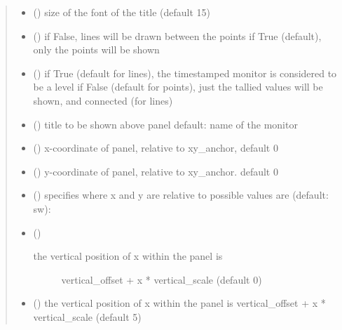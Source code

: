 \documentclass[letterpaper,10pt,english]{sphinxmanual}
\begin{document}
\begin{fulllineitems}
\begin{fulllineitems}
\begin{quote}
\begin{description}
\begin{itemize}
\item {} 
 () \textendash{} size of the font of the title (default 15)

\item {} 
 () \textendash{} if False, lines will be drawn between the points 
if True (default),  only the points will be shown

\item {} 
 () \textendash{} if True (default for lines), the timestamped monitor is considered to be a level
if False (default for points), just the tallied values will be shown, and connected (for lines)

\item {} 
 () \textendash{} title to be shown above panel 
default: name of the monitor

\item {} 
 () \textendash{} x-coordinate of panel, relative to xy\_anchor, default 0

\item {} 
 () \textendash{} y-coordinate of panel, relative to xy\_anchor. default 0

\item {} 
 () \textendash{} specifies where x and y are relative to 
possible values are (default: sw): 

\item {} 
 () \textendash{} \begin{description}
\item[{the vertical position of x within the panel is}] \leavevmode
vertical\_offset + x * vertical\_scale (default 0)

\end{description}


\item {} 
 () \textendash{} the vertical position of x within the panel is
vertical\_offset + x * vertical\_scale (default 5)


\end{itemize}
\end{description}
\end{quote}
\end{fulllineitems}
\end{fulllineitems}
\end{document}
